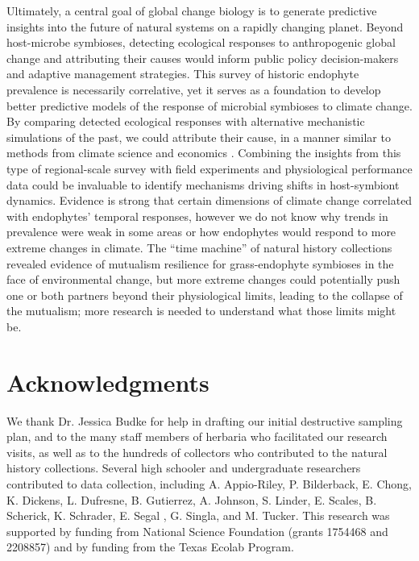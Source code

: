 \documentclass[11pt]{article}
\begin{document}
Ultimately, a central goal of global change biology is to generate predictive insights into the future of natural systems on a rapidly changing planet. 
Beyond host-microbe symbioses, detecting ecological responses to anthropogenic global change and attributing their causes would inform public policy decision-makers and adaptive management strategies.
This survey of historic endophyte prevalence is necessarily correlative, yet it serves as a foundation to develop better predictive models of the response of microbial symbioses to climate change. 
By comparing detected ecological responses with alternative mechanistic simulations of the past, we could attribute their cause, in a manner similar to methods from climate science and economics \citep{stott2010detection, carleton2016social,trenberth2015attribution}.
Combining the insights from this type of regional-scale survey with field experiments and physiological performance data could be invaluable to identify mechanisms driving shifts in host-symbiont dynamics.
Evidence is strong that certain dimensions of climate change correlated with endophytes' temporal responses, however we do not know why trends in prevalence were weak in some areas or how endophytes would respond to more extreme changes in climate.
The ``time machine'' of natural history collections revealed evidence of mutualism resilience for grass-endophyte symbioses in the face of environmental change, but more extreme changes could potentially push one or both partners beyond their physiological limits, leading to the collapse of the mutualism; more research is needed to understand what those limits might be. 


	
	\section*{Acknowledgments}
	We thank Dr. Jessica Budke for help in drafting our initial destructive sampling plan, and to the many staff members of herbaria who facilitated our research visits, as well as to the hundreds of collectors who contributed to the natural history collections. 
	Several high schooler and undergraduate researchers contributed to data collection, including A. Appio-Riley, P. Bilderback, E. Chong, K. Dickens, L. Dufresne, B. Gutierrez, A. Johnson, S. Linder, E. Scales, B. Scherick, K. Schrader, E. Segal , G. Singla, and M. Tucker.
	This research was supported by funding from National Science Foundation (grants 1754468 and 2208857) and by funding from the Texas Ecolab Program.
\end{document}
